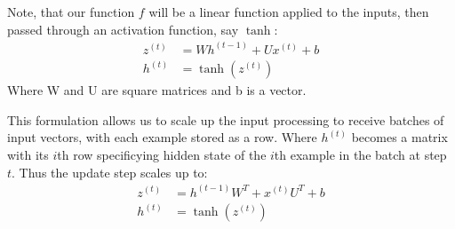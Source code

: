 \documentclass[12pt]{article}
\begin{document}
Note, that our function $f$ will be a linear function applied to the inputs, then passed through an activation function, say $\tanh$:
\begin{align*}
    z^{(t)} &= Wh^{(t-1)} + Ux^{(t)} + b \\
    h^{(t)} &= \tanh(z^{(t)})
\end{align*}
Where W and U are square matrices and b is a vector.


This formulation allows us to scale up the input processing to receive batches of input vectors, with each example stored as a row. Where $h^{(t)}$ becomes a matrix with its $i$th row
specificying hidden state of the $i$th example in the batch at step $t$. Thus the update step scales up to:
\begin{align*}
    z^{(t)} &= h^{(t-1)}W^T + x^{(t)}U^T + b \\
    h^{(t)} &= \tanh(z^{(t)})
\end{align*}
\end{document}
